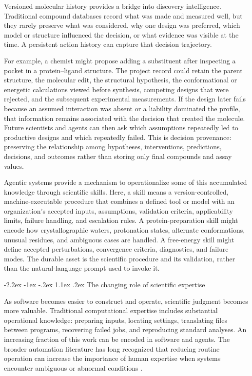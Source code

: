 \documentclass[11pt]{article}
\makeatletter
\renewcommand\section{\@startsection{section}{1}{\z@}%
  {-2.2ex \@plus -1ex \@minus -.2ex}%
  {1.1ex \@plus .2ex}%
  {\normalfont\Large\bfseries\color{molblue}}}
\makeatother
\begin{document}
Versioned molecular history provides a bridge into discovery intelligence. Traditional compound databases record what was made and measured well, but they rarely preserve what was considered, why one design was preferred, which model or structure influenced the decision, or what evidence was visible at the time. A persistent action history can capture that decision trajectory.

For example, a chemist might propose adding a substituent after inspecting a pocket in a protein--ligand structure. The project record could retain the parent structure, the molecular edit, the structural hypothesis, the conformational or energetic calculations viewed before synthesis, competing designs that were rejected, and the subsequent experimental measurements. If the design later fails because an assumed interaction was absent or a liability dominated the profile, that information remains associated with the decision that created the molecule. Future scientists and agents can then ask which assumptions repeatedly led to productive designs and which repeatedly failed. This is decision provenance: preserving the relationship among hypotheses, interventions, predictions, decisions, and outcomes rather than storing only final compounds and assay values.

Agentic systems provide a mechanism to operationalize some of this accumulated knowledge through scientific skills. Here, a skill means a version-controlled, machine-executable procedure that combines a defined tool or model with an organization's accepted inputs, assumptions, validation criteria, applicability limits, failure handling, and escalation rules. A protein-preparation skill might encode how crystallographic waters, protonation states, alternate conformations, unusual residues, and ambiguous cases are handled. A free-energy skill might define accepted perturbations, convergence criteria, diagnostics, and failure modes. The durable asset is the scientific procedure and its validation, rather than the natural-language prompt used to invoke it.

\section{The changing role of scientific expertise}

As software becomes easier to construct and operate, scientific judgment becomes more valuable. Traditional computational expertise includes substantial operational knowledge: preparing inputs, locating settings, translating files between programs, recovering failed jobs, and reproducing standard analyses. An increasing fraction of this work can be encoded in software and agents. The broader automation literature has long recognized that reducing routine operation can increase the importance of human expertise when systems encounter ambiguous or abnormal conditions \citep{bainbridge1983ironies}.
\end{document}
